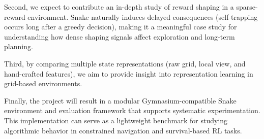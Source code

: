 \documentclass[10pt,twocolumn,letterpaper]{article}
\begin{document}
Second, we expect to contribute an in-depth study of reward shaping in a sparse-reward environment. Snake naturally induces delayed consequences (self-trapping occurs long after a greedy decision), making it a meaningful case study for understanding how dense shaping signals affect exploration and long-term planning. 

Third, by comparing multiple state representations (raw grid, local view, and hand-crafted features), we aim to provide insight into representation learning in grid-based environments.

Finally, the project will result in a modular Gymnasium-compatible Snake environment and evaluation framework that supports systematic experimentation. This implementation can serve as a lightweight benchmark for studying algorithmic behavior in constrained navigation and survival-based RL tasks.
\end{document}

